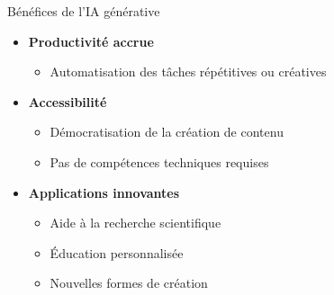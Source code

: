 \begin{frame}{Bénéfices de l'IA générative}

\begin{itemize}
    \item<+->[\colormark{green}] \textbf{Productivité accrue}
        \begin{itemize}
            \item[\textcolor{white}{x}] Automatisation des tâches répétitives ou créatives
        \end{itemize}

    \vspace{0.2cm}
    \item<+->[\colormark{green}] \textbf{Accessibilité}
        \begin{itemize}
            \item[\textcolor{white}{x}] Démocratisation de la création de contenu
            \item[\textcolor{white}{x}] Pas de compétences techniques requises
        \end{itemize}

    \vspace{0.2cm}
    \item<+->[\colormark{green}] \textbf{Applications innovantes}
        \begin{itemize}
            \item[\textcolor{white}{x}] Aide à la recherche scientifique
            \item[\textcolor{white}{x}] Éducation personnalisée
            \item[\textcolor{white}{x}] Nouvelles formes de création
        \end{itemize}
\end{itemize}

\end{frame}

